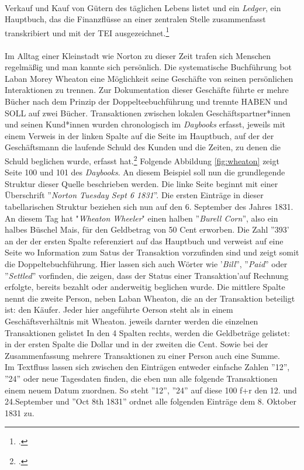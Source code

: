 \documentclass[12pt,a4paper]{article}
\begin{document}
\\
Verkauf und Kauf von Gütern des täglichen Lebens listet und ein \textit{Ledger}, ein Hauptbuch, das die Finanzflüsse an einer zentralen Stelle zusammenfasst transkribiert und mit der TEI ausgezeichnet.\footcite[][]{tomasek2013encoding}
\\
\\
Im Alltag einer Kleinstadt wie Norton zu dieser Zeit trafen sich Menschen regelmäßig und man kannte sich persönlich. Die systematische Buchführung bot Laban Morey Wheaton eine Möglichkeit seine Geschäfte von seinen persönlichen Interaktionen zu trennen. Zur Dokumentation dieser Geschäfte führte er mehre Bücher nach dem Prinzip der Doppelteebuchführung und trennte HABEN und SOLL auf zwei Bücher. Transaktionen zwischen lokalen Geschäftspartner*innen und seinen Kund*innen wurden chronologisch im \textit{Daybooks} erfasst, jeweils mit einem Verweis in der linken Spalte auf die Seite im Hauptbuch, auf der der Geschäftsmann die laufende Schuld des Kunden und die Zeiten, zu denen die Schuld beglichen wurde, erfasst hat.\footcite[][S.7-9]{tomasek2013encoding} Folgende Abbildung \ref{fig:wheaton} zeigt Seite 100 und 101 des \textit{Daybooks}. An diesem Beispiel soll nun die grundlegende Struktur dieser Quelle beschrieben werden. Die linke Seite beginnt mit einer Überschrift ''\textit{Norton Tuesday Sept 6 1831}''. Die ersten Einträge in dieser tabellarischen Struktur beziehen sich nun auf den 6. September des Jahres 1831. An diesem Tag hat "\textit{Wheaton Wheeler}" einen halben ''\textit{Burell Corn}'', also ein halbes Büschel Mais, für den Geldbetrag von 50 Cent erworben. Die Zahl ''393' an der der ersten Spalte  referenziert auf das Hauptbuch und verweist auf eine Seite wo Information zum Satus der Transaktion vorzufinden sind und zeigt somit die Doppeltebuchführung. Hier lassen sich auch Wörter wie '\textit{Bill}'', ''\textit{Paid}'' oder ''\textit{Settled}'' vorfinden, die zeigen, dass der Status einer Transaktion'auf Rechnung erfolgte, bereits bezahlt oder anderweitig beglichen wurde. Die mittlere Spalte nennt die zweite Person, neben Laban Wheaton, die an der Transaktion beteiligt ist: den Käufer. Jeder hier angeführte Oerson steht als in einem Geschäftsverhältnis mit Wheaton. jeweils darnter werden die einzelnen Transaktionen gelistet In den 4 Spalten rechts, werden die Geldbeträge gelistet: in der ersten Spalte die Dollar und in der zweiten die Cent. Sowie bei der Zusammenfassung mehrere Transaktionen zu einer Person auch eine Summe.
\\
Im Textfluss lassen sich zwischen den Einträgen entweder einfache Zahlen ''12'', ''24'' oder neue Tagesdaten finden, die eben nun alle folgende Transaktionen einem neuem Datum zuordnen. So steht ''12'', ''24'' auf diese 100 f+r den 12. und 24.September und ''Oct 8th 1831'' ordnet alle folgenden Einträge  dem 8. Oktober 1831 zu.
\end{document}
